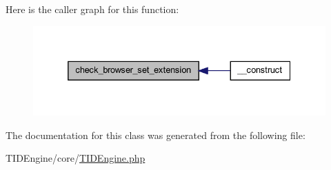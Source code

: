 Here is the caller graph for this function:\nopagebreak
\begin{figure}[H]
\begin{center}
\leavevmode
\includegraphics[width=332pt]{class_t_i_d_engine_a16783567e39b102990730f699675819c_icgraph}
\end{center}
\end{figure}




The documentation for this class was generated from the following file:\begin{DoxyCompactItemize}
\item 
TIDEngine/core/\hyperlink{_t_i_d_engine_8php}{TIDEngine.php}\end{DoxyCompactItemize}
